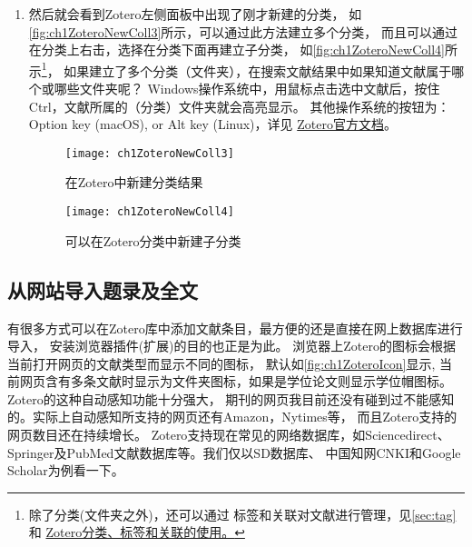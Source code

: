 \documentclass[cn,11pt,chinese]{elegantbook}
\begin{document}
\begin{enumerate}
\begin{figure}
			\end{figure}
			\item 
			然后就会看到Zotero左侧面板中出现了刚才新建的分类，
			如\autoref{fig:ch1ZoteroNewColl3}所示，可以通过此方法建立多个分类，
			而且可以通过在分类上右击，选择在分类下面再建立子分类，
			如\autoref{fig:ch1ZoteroNewColl4}所示\footnote{除了分类(文件夹之外)，还可以通过
			标签和关联对文献进行管理，见\cref{sec:tag}和
			\href{https://zhuanlan.zhihu.com/p/275707703}{Zotero分类、标签和关联的使用。}}，
			如果建立了多个分类（文件夹），在搜索文献结果中如果知道文献属于哪个或哪些文件夹呢？
			Windows操作系统中，用鼠标点击选中文献后，按住Ctrl，文献所属的（分类）文件夹就会高亮显示。
			其他操作系统的按钮为： Option key (macOS), or Alt key (Linux)，详见
			\href{https://www.zotero.org/support/collections_and_tags#identifying_collections_an_item_is_in}{Zotero官方文档}。
			
			\begin{figure}[htbp]
				\begin{minipage}[t]{0.4\linewidth}
					\centering
					\texttt{[image: ch1ZoteroNewColl3]}
					\caption{在Zotero中新建分类结果}
					\label{fig:ch1ZoteroNewColl3}
				\end{minipage}
				\begin{minipage}[t]{0.7\linewidth}
					\centering
					\texttt{[image: ch1ZoteroNewColl4]}
					\caption{可以在Zotero分类中新建子分类}
					\label{fig:ch1ZoteroNewColl4}
				\end{minipage}
			\end{figure}
		\end{enumerate}
	\subsection{从网站导入题录及全文} \label{sec:ImportFromWeb}
		有很多方式可以在Zotero库中添加文献条目，最方便的还是直接在网上数据库进行导入，
		安装浏览器插件(扩展)的目的也正是为此。
		浏览器上Zotero的图标会根据当前打开网页的文献类型而显示不同的图标，
		默认如\autoref{fig:ch1ZoteroIcon}显示,
		当前网页含有多条文献时显示为文件夹图标，如果是学位论文则显示学位帽图标。
		Zotero的这种自动感知功能十分强大，
		期刊的网页我目前还没有碰到过不能感知的。实际上自动感知所支持的网页还有Amazon，Nytimes等，
		而且Zotero支持的网页数目还在持续增长。
		Zotero支持现在常见的网络数据库，如Sciencedirect、Springer及PubMed文献数据库等。我们仅以SD数据库、
		中国知网CNKI和Google Scholar为例看一下。
\end{document}
